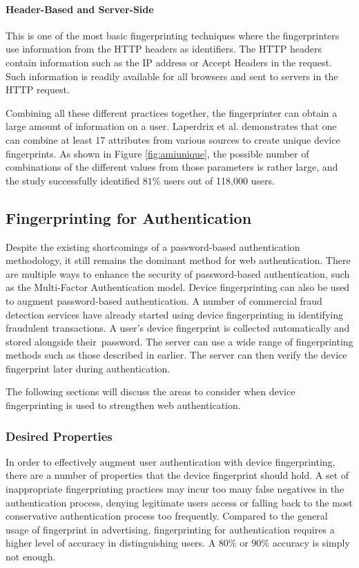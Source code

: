 \documentclass{acm_proc_article-sp}
\begin{document}
\paragraph{Header-Based and Server-Side}
This is one of the most basic fingerprinting techniques where the fingerprinters use information from the HTTP headers as identifiers. The HTTP headers contain information such as the IP address or Accept Headers in the request. Such information is readily available for all browsers and sent to  servers in the HTTP request.

Combining all these different practices together, the fingerprinter can obtain a large amount of information on a user.  Laperdrix et al. \cite{pierre:beauty} demonstrates that one can combine at least 17 attributes from various sources to create unique device fingerprints. As shown in Figure \ref{fig:amiunique}, the possible number of combinations of the different values from those parameters is rather large, and the study successfully identified $81\%$ users out of 118,000 users.



\subsection{Fingerprinting for Authentication}
Despite the existing shortcomings of a password-based authentication methodology, it still remains the dominant method for web authentication. There are multiple ways to enhance the security of password-based authentication, such as the Multi-Factor Authentication model. Device fingerprinting can also be used to augment password-based authentication.
A number of commercial fraud detection services have already started using device fingerprinting in identifying fraudulent transactions.\cite{maxmind} \cite{parame} A user's device fingerprint is collected automatically and stored alongside their\ password.  The server can use a wide range of fingerprinting methods such as those described in earlier. The server can then verify the device fingerprint later during authentication.

The following sections will discuss the areas to consider when device fingerprinting is used to strengthen web authentication.


\subsubsection{Desired Properties}
In order to effectively augment user authentication with device fingerprinting, there are a number of properties that the device fingerprint should hold. A set of inappropriate fingerprinting practices may incur too many false negatives in the authentication process, denying legitimate users access or falling back to the most conservative authentication process too frequently. 
Compared to the general usage of fingerprint in advertising, fingerprinting for authentication requires a higher level of accuracy in distinguishing users. A $80\%$ or $90\%$ accuracy is simply not enough. \cite{alca:dev}
\end{document}
